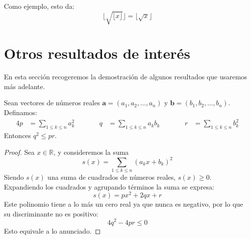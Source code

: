   Como ejemplo,
  esto da:
  \begin{equation*}
    \lfloor \sqrt{\lfloor x \rfloor} \rfloor
      = \lfloor \sqrt{x} \rfloor
  \end{equation*}

\section{Otros resultados de interés}
\label{sec:resultados-interesantes}

  En esta sección recogeremos la demostración de algunos resultados
  que usaremos más adelante.

  \begin{theorem}
    \label{theo:Cauchy-Schwarz}
    Sean vectores de números reales
    \mbox{\(\boldsymbol{a} = (a_1, a_2, \dotsc, a_n)\)}
    y \mbox{\(\boldsymbol{b} =(b_1, b_2, \dotsc, b_n)\)}.
    Definamos:
    \begin{alignat*}{4}
      p &= \sum_{1 \le k \le n} a_k^2
	&\qquad&
      q &= \sum_{1 \le k \le n} a_k b_k
	&\qquad&
      r &= \sum_{1 \le k \le n} b_k^2
    \end{alignat*}
    Entonces \(q^2 \le p r\).
  \end{theorem}
  \begin{proof}
    Sea \(x \in \mathbb{R}\),
    y consideremos la suma
    \begin{equation*}
      s(x)
	= \sum_{1 \le k \le n} (a_k x + b_k)^2
    \end{equation*}
    Siendo \(s(x)\) una suma de cuadrados de números reales,
    \(s(x) \ge 0\).
    Expandiendo los cuadrados y agrupando términos
    la suma se expresa:
    \begin{equation*}
      s(x)
	= p x^2 + 2 q x + r
    \end{equation*}
    Este polinomio tiene a lo más un cero real ya que nunca es negativo,
    por lo que su discriminante no es positivo:
    \begin{equation*}
      4 q^2 - 4 p r
	\le 0
    \end{equation*}
    Esto equivale a lo anunciado.
  \end{proof}

